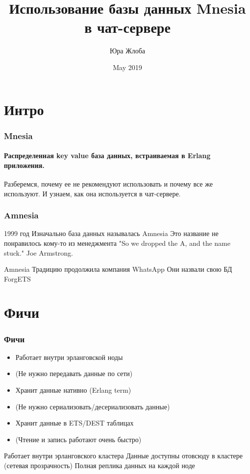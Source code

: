 \documentclass{beamer}
\title{Использование базы данных Mnesia в чат-сервере}
\author{Юра Жлоба}
\institute{Wargaming.net}
\date{May 2019}
\begin{document}
\maketitle

\section{Интро}

\begin{frame}
  \frametitle{Mnesia}
  \framesubtitle{Распределенная key value база данных, встраиваемая в Erlang приложения.}
  Разберемся, почему ее не рекомендуют использовать и почему все же используют.
  И узнаем, как она используется в чат-сервере.
\end{frame}

\begin{frame}
  \frametitle{Amnesia}
1999 год
Изначально база данных называлась Amnesia
Это название не понравилось кому-то из менеджмента
"So we dropped the A, and the name stuck." Joe Armstrong.
\end{frame}

\begin{frame}
 Amnesia
Традицию продолжила компания WhatsApp
Они назвали свою БД
ForgETS
\end{frame}

\section{Фичи}

\begin{frame}
    \frametitle{Фичи}
  \begin{itemize}[<+->]
    \item Работает внутри эрланговской ноды
    \item (Не нужно передавать данные по сети)
    \item Хранит данные нативно (Erlang term)
    \item (Не нужно сериализовать/десериализовать данные)
    \item Хранит данные в ETS/DEST таблицах
    \item (Чтение и запись работают очень быстро)
  \end{itemize}
\end{frame}

\begin{frame}
 Работает внутри эрланговского кластера
Данные доступны отовсюду в кластере (сетевая прозрачность)
Полная реплика данных на каждой ноде
\end{frame}
\end{document}
